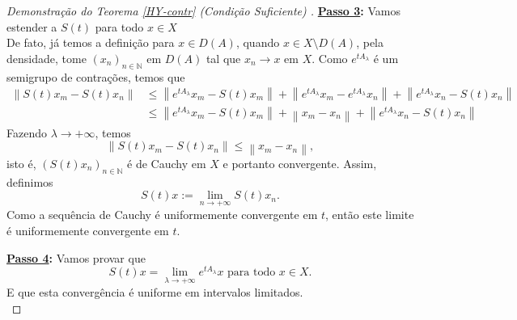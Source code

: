 \begin{proof}[Demonstração do Teorema {\ref{HY-contr}} (Condição Suficiente) ]
\noindent\textbf{\underline{Passo 3}:} Vamos estender a $S(t)$ para todo $x\in X$
\\
%

De fato, já temos a definição para $x\in D(A)$, quando $x\in X\setminus D(A)$,
pela densidade, tome $(x_n)_{n\in \mathbb N}$ em $D(A)$
tal que $x_n\to x$ em $X$. 
Como $e^{tA_\lambda}$ é um semigrupo de contrações, temos que
\begin{align*}
\left\|S(t)x_m-S(t)x_n\right\|
&  \leq \left\|e^{tA_{\lambda}}x_m-S(t)x_m\right\|
+\left\|e^{tA_{\lambda}}x_m-e^{tA_{\lambda}}x_n\right\|+
\left\|e^{tA_{\lambda}}x_n-S(t)x_n\right\|\\
& \leq \left\|e^{tA_{\lambda}}x_m-S(t)x_m\right\|
+\left\|x_m-x_n\right\|+
\left\|e^{tA_{\lambda}}x_n-S(t)x_n\right\|
\end{align*}
Fazendo $\lambda \to +\infty$, temos
\begin{equation*}
\left\|S(t)x_m-S(t)x_n\right\|
 \leq \left\|x_m-x_n\right\|, 
\end{equation*}
isto é, $(S(t)x_n)_{n\in \mathbb{N}}$ é de Cauchy em $X$ e portanto convergente. 
Assim, definimos 
\begin{equation}\label{lim2.1}
S(t)x:=\displaystyle \lim_{n\to +\infty} S(t)x_n.
\end{equation}
Como a sequência de Cauchy é uniformemente convergente em $t$, então este limite 
é uniformemente convergente em $t$.


\noindent\textbf{\underline{Passo 4}:} Vamos provar que
\begin{equation}\label{P3.14.2}
S(t)x =\lim\limits_{\lambda \to +\infty}e^{tA_\lambda}x
\text{ para todo } x\in X.
\end{equation}
E que esta convergência é uniforme em intervalos limitados.
\\



\end{proof}
